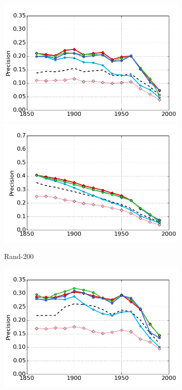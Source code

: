 \documentclass[output=paper]{langsci/langscibook}
\begin{document}
\begin{figure}[t]
\begin{subfigure}{.32\textwidth}
  \includegraphics[width=.98\linewidth]{figures/GREWAL_precision_rand200.png}\\
  \includegraphics[width=.98\linewidth]{figures/GREWAL_precision_rand200_future.png}
  \caption{\sc Rand-200}
\end{subfigure}
\begin{subfigure}{.32\textwidth}
  \centering
  \includegraphics[width=.98\linewidth]{figures/GREWAL_precision_syn65.png}\\

\end{subfigure}
\end{figure}
\end{document}

